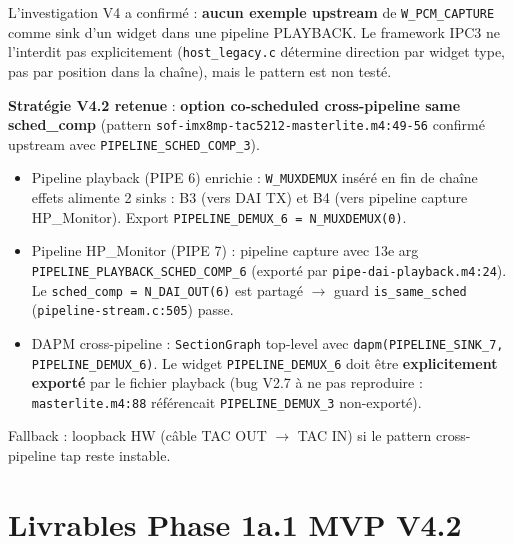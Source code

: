 \documentclass[11pt,a4paper]{article}
\begin{document}
L'investigation V4 a confirmé : \textbf{aucun exemple upstream} de \texttt{W\_PCM\_CAPTURE} comme sink d'un widget dans une pipeline PLAYBACK. Le framework IPC3 ne l'interdit pas explicitement (\texttt{host\_legacy.c} détermine direction par widget type, pas par position dans la chaîne), mais le pattern est non testé.

\textbf{Stratégie V4.2 retenue} : \textbf{option co-scheduled cross-pipeline same sched\_comp} (pattern \texttt{sof-imx8mp-tac5212-masterlite.m4:49-56} confirmé upstream avec \texttt{PIPELINE\_SCHED\_COMP\_3}).

\begin{itemize}[leftmargin=*, itemsep=1pt]
  \item Pipeline playback (PIPE 6) enrichie : \texttt{W\_MUXDEMUX} inséré en fin de chaîne effets alimente 2 sinks : B3 (vers DAI TX) et B4 (vers pipeline capture HP\_Monitor). Export \texttt{PIPELINE\_DEMUX\_6 = N\_MUXDEMUX(0)}.
  \item Pipeline HP\_Monitor (PIPE 7) : pipeline capture avec 13e arg \texttt{PIPELINE\_PLAYBACK\_SCHED\_COMP\_6} (exporté par \texttt{pipe-dai-playback.m4:24}). Le \texttt{sched\_comp = N\_DAI\_OUT(6)} est partagé $\to$ guard \texttt{is\_same\_sched} (\texttt{pipeline-stream.c:505}) passe.
  \item DAPM cross-pipeline : \texttt{SectionGraph} top-level avec \texttt{dapm(PIPELINE\_SINK\_7, PIPELINE\_DEMUX\_6)}. Le widget \texttt{PIPELINE\_DEMUX\_6} doit être \textbf{explicitement exporté} par le fichier playback (bug V2.7 à ne pas reproduire : \texttt{masterlite.m4:88} référencait \texttt{PIPELINE\_DEMUX\_3} non-exporté).
\end{itemize}

Fallback : loopback HW (câble TAC OUT $\to$ TAC IN) si le pattern cross-pipeline tap reste instable.

\section{Livrables Phase 1a.1 MVP V4.2}
\end{document}
